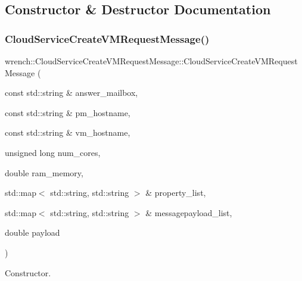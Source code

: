\subsection{Constructor \& Destructor Documentation}
\mbox{\label{classwrench_1_1_cloud_service_create_v_m_request_message_af1429cfb426e6db09c82fff0d5f68a19}} 
\subsubsection{\texorpdfstring{Cloud\+Service\+Create\+V\+M\+Request\+Message()}{CloudServiceCreateVMRequestMessage()}}
{\footnotesize\ttfamily wrench\+::\+Cloud\+Service\+Create\+V\+M\+Request\+Message\+::\+Cloud\+Service\+Create\+V\+M\+Request\+Message (\begin{DoxyParamCaption}\item[{const std\+::string \&}]{answer\+\_\+mailbox,  }\item[{const std\+::string \&}]{pm\+\_\+hostname,  }\item[{const std\+::string \&}]{vm\+\_\+hostname,  }\item[{unsigned long}]{num\+\_\+cores,  }\item[{double}]{ram\+\_\+memory,  }\item[{std\+::map$<$ std\+::string, std\+::string $>$ \&}]{property\+\_\+list,  }\item[{std\+::map$<$ std\+::string, std\+::string $>$ \&}]{messagepayload\+\_\+list,  }\item[{double}]{payload }\end{DoxyParamCaption})}



Constructor. 


